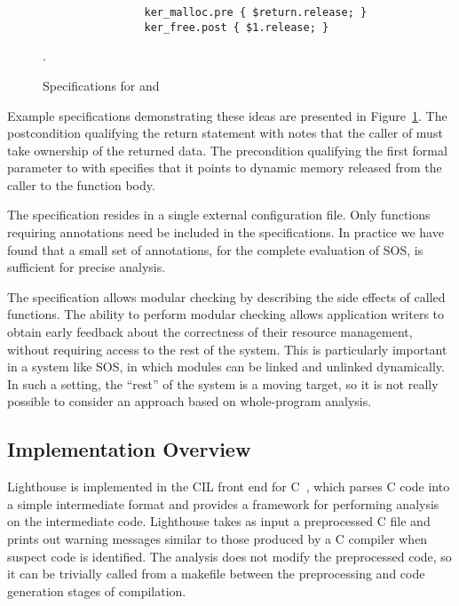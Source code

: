 \begin{figure}[tp]
\centering
\lstset{numbers=none, language=C}
\begin{lstlisting}
                ker_malloc.pre { $return.release; }
                ker_free.post { $1.release; }
\end{lstlisting}
\caption{\label{fig:spec}Specifications for  and
}.
\end{figure}



Example specifications demonstrating these ideas are presented in
Figure~\ref{fig:spec}.
%
The postcondition qualifying the return statement with  notes
that the caller of  must take ownership of the returned
data.
%
The precondition qualifying the first formal parameter to 
with  specifies that it points to dynamic memory released from
the caller to the function body.



The specification resides in a single external configuration file.
%
Only functions requiring annotations need be included in the specifications.
%
In practice we have found that a small set of annotations, \numannote for
the complete evaluation of SOS, is sufficient for precise analysis. 



The specification allows modular checking by describing the side effects of
called functions.
%
The ability to perform modular checking allows application writers to obtain
early feedback about the correctness of their resource management, without
requiring access to the rest of the system.  
%
This is particularly important in a system like SOS, in which modules can be
linked and unlinked dynamically.  
%
In such a setting, the ``rest'' of the system is a moving target, so it is not
really possible to consider an approach based on whole-program analysis.



\subsection{Implementation Overview}



Lighthouse is implemented in the CIL front end for C~\cite{CIL}, which
parses C code into a simple intermediate format and provides a framework for
performing analysis on the intermediate code. 
%
Lighthouse takes as input a preprocessed C file and prints out warning
messages similar to those produced by a C compiler when suspect code is
identified.
%
The analysis does not modify the preprocessed code, so it can be trivially
called from a makefile between the preprocessing and code generation stages
of compilation.




